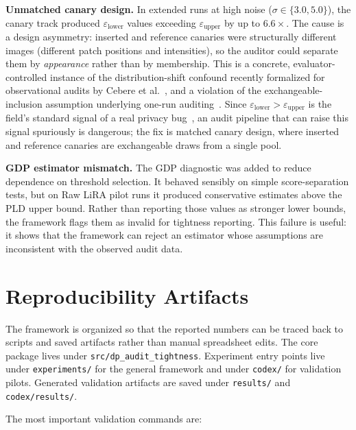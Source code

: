 \documentclass{article}
\begin{document}
\textbf{Unmatched canary design.} In extended runs at high noise ($\sigma \in \{3.0, 5.0\}$), the canary track produced $\varepsilon_{\text{lower}}$ values exceeding $\varepsilon_{\text{upper}}$ by up to $6.6\times$. The cause is a design asymmetry: inserted and reference canaries were structurally different images (different patch positions and intensities), so the auditor could separate them by \emph{appearance} rather than by membership. This is a concrete, evaluator-controlled instance of the distribution-shift confound recently formalized for observational audits by Cebere et al.~\citep{cebere2026zerorun}, and a violation of the exchangeable-inclusion assumption underlying one-run auditing~\citep{steinke2023privacy}. Since $\varepsilon_{\text{lower}} > \varepsilon_{\text{upper}}$ is the field's standard signal of a real privacy bug~\citep{tramer2022debugging}, an audit pipeline that can raise this signal spuriously is dangerous; the fix is matched canary design, where inserted and reference canaries are exchangeable draws from a single pool.

\textbf{GDP estimator mismatch.} The GDP diagnostic was added to reduce dependence on threshold selection. It behaved sensibly on simple score-separation tests, but on Raw LiRA pilot runs it produced conservative estimates above the PLD upper bound. Rather than reporting those values as stronger lower bounds, the framework flags them as invalid for tightness reporting. This failure is useful: it shows that the framework can reject an estimator whose assumptions are inconsistent with the observed audit data.

\section{Reproducibility Artifacts}
\label{sec:reproducibility}

The framework is organized so that the reported numbers can be traced back to scripts and saved artifacts rather than manual spreadsheet edits. The core package lives under \texttt{src/dp\_audit\_tightness}. Experiment entry points live under \texttt{experiments/} for the general framework and under \texttt{codex/} for validation pilots. Generated validation artifacts are saved under \texttt{results/} and \texttt{codex/results/}.

The most important validation commands are:
\end{document}
